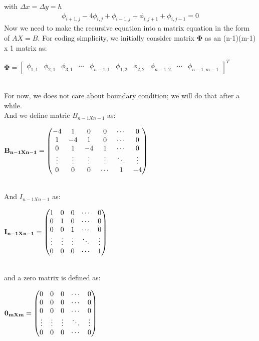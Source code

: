 \documentclass{article}
\begin{document}
with $\Delta x = \Delta y = h$\\
\begin{align}
    \phi_{i+1, j} - 4\phi_{i, j} + \phi_{i-1, j} + \phi_{i, j+1} + \phi_{i, j-1}= 0 \nonumber
\end{align}
Now we need to make the recursive equation into a matrix equation in the form of $AX=B$. For coding simplicity, we initially consider matrix $\mathbf{\Phi}$ as an (n-1)(m-1) x 1 matrix as:\\
\centerline{$\mathbf{\Phi} = 
\begin{bmatrix}
    \phi_{1,1} & \phi_{2,1} & \phi_{3,1} &\cdots & \phi_{n-1,1} & \phi_{1,2} & \phi_{2,2} &\phi_{n-1, 2} &\cdots & \phi_{n-1, m-1} 
\end{bmatrix}^T$}\\
\newpage
For now, we does not care about boundary condition; we will do that after a while.\\
And we define matric $B_{n-1Xn-1}$ as:\\
\centerline{$\bf{B}_{n-1Xn-1} = 
\begin{pmatrix}
    -4 & 1 & 0 & 0 & \cdots & 0 \\
    1 & -4 & 1 & 0 & \cdots & 0 \\
    0 & 1 & -4 & 1 & \cdots & 0 \\
    \vdots  & \vdots  & \vdots & \vdots & \ddots & \vdots \\
    0& 0 & 0 & \cdots & 1 & -4 
\end{pmatrix}$}\\
And $I_{n-1Xn-1}$ as:\\
\centerline{$\bf{I}_{n-1Xn-1} = 
\begin{pmatrix}
    1 & 0 & 0 &  \cdots & 0 \\
    0 & 1 & 0 &  \cdots & 0 \\
    0 & 0 & 1 &  \cdots & 0 \\
    \vdots  &  \vdots & \vdots & \ddots & \vdots \\
    0& 0 & 0 & \cdots  & 1 
\end{pmatrix}$}\\
and a zero matrix is defined as:\\
\centerline{$\bf{0}_{mXm} = 
\begin{pmatrix}
    0 & 0 & 0 &  \cdots & 0 \\
    0 & 0 & 0 &  \cdots & 0 \\
    0 & 0 & 0 &  \cdots & 0 \\
    \vdots  &  \vdots & \vdots & \ddots & \vdots \\
    0& 0 & 0 & \cdots  & 0 
\end{pmatrix}$}\\
\end{document}
